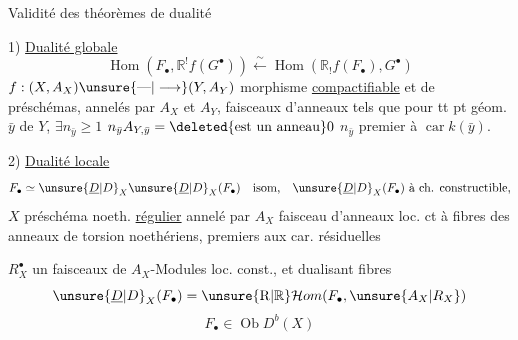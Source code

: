Validité des théorèmes de dualité

1) \uline{Dualité globale}
\[
\operatorname{Hom}(F_\bullet,\mathbb{R}^{!}f(G^{\bullet}))\xleftarrow{\sim}\operatorname{Hom}(\mathbb{R}_{!}f(F_\bullet),G^{\bullet})
\]
$f:(X,A_X)\unsure{\text{---}|\longrightarrow}(Y,A_Y)$ morphisme \uline{compactifiable} et \uline{} de préschémas, annelés par $A_X$ et $A_Y$,  faisceaux d'anneaux  tels que pour tt pt géom. $\bar{y}$ de $Y$, $\exists n_{\bar{y}}\geq1$  $n_{\bar{y}}A_{Y,\bar{y}}=\deleted{\text{est un anneau}}0$ $n_{\bar{y}}$ premier à $\operatorname{car}k(\bar{y})$.

2) \uline{Dualité locale}
\[
F_\bullet\simeq\unsure{\underline{D}|D}_X\unsure{\underline{D}|D}_X(F_\bullet)\quad\text{isom,}\quad\unsure{\underline{D}|D}_X(F_\bullet)\text{ à ch. constructible,}
\]
$X$ préschéma  noeth. \uline{régulier} annelé par $A_X$ faisceau d'anneaux loc. ct à fibres   des anneaux de torsion noethériens, premiers aux car. résiduelles

$R_X^{\bullet}$ un  faisceaux de $A_X$-Modules loc. const., et dualisant  fibres 
\[
\unsure{\underline{D}|D}_X(F_\bullet)=\unsure{\mathrm{R}|\mathbb{R}}\mathcal{H}om(F_\bullet,\unsure{A_X|R_X})
\]
\[
F_\bullet\in\operatorname{Ob}D^b(X)
\]
